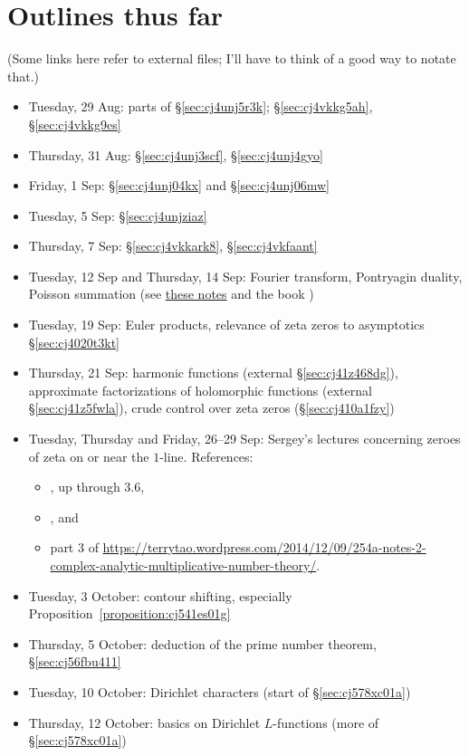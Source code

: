\documentclass[reqno]{amsart}  \numberwithin{theorem}{section} \numberwithin{equation}{section}
\begin{document}
\section{Outlines thus far}
(Some links here refer to external files; I'll have to think of a good way to notate that.)
\begin{itemize}
\item Tuesday, 29 Aug: parts of \S\ref{sec:cj4unj5r3k}; \S\ref{sec:cj4vkkg5ah}, \S\ref{sec:cj4vkkg9es}
\item Thursday, 31 Aug: \S\ref{sec:cj4unj3scf}, \S\ref{sec:cj4unj4gyo}
\item Friday, 1 Sep: \S\ref{sec:cj4unj04kx} and \S\ref{sec:cj4unj06mw}
\item Tuesday, 5 Sep: \S\ref{sec:cj4unjziaz}
\item Thursday, 7 Sep: \S\ref{sec:cj4vkkark8}, \S\ref{sec:cj4vkfaant}
\item Tuesday, 12 Sep and Thursday, 14 Sep: Fourier transform, Pontryagin duality, Poisson summation (see \href{20230919T144827--discrete-fourier-transform.pdf}{these notes} and the book \cite{MR3289059})
\item Tuesday, 19 Sep: Euler products, relevance of zeta zeros to asymptotics \S\ref{sec:cj4020t3kt}
\item Thursday, 21 Sep: harmonic functions (external \S\ref{sec:cj41z468dg}), approximate factorizations of holomorphic functions (external \S\ref{sec:cj41z5fwla}), crude control over zeta zeros (\S\ref{sec:cj410a1fzy})
\item Tuesday, Thursday and Friday, 26--29 Sep: Sergey's lectures concerning zeroes of zeta on or near the $1$-line.  References:
  \begin{itemize}
  \item \cite[Chapter III]{MR882550}, up through 3.6,
  \item \cite[Chapter 13]{Dav80}, and
  \item part 3 of \href{these notes}{https://terrytao.wordpress.com/2014/12/09/254a-notes-2-complex-analytic-multiplicative-number-theory/}.
  \end{itemize}
\item Tuesday, 3 October: contour shifting, especially Proposition~\ref{proposition:cj541es01g}
\item Thursday, 5 October: deduction of the prime number theorem, \S\ref{sec:cj56fbu411}
\item Tuesday, 10 October: Dirichlet characters (start of \S\ref{sec:cj578xc01a})
\item Thursday, 12 October: basics on Dirichlet $L$-functions  (more of \S\ref{sec:cj578xc01a})
\end{itemize}
\end{document}
